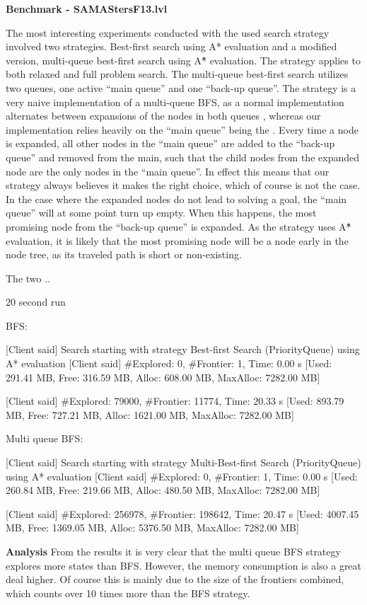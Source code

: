 \textbf{Benchmark - SAMAStersF13.lvl}


The most interesting experiments conducted with the used search strategy involved two strategies. Best-first search using A* evaluation and a modified version, multi-queue best-first search using A\^{*} evaluation. The strategy applies to both relaxed and full problem search. 
The multi-queue best-first search utilizes two queues, one active ``main queue'' and one ``back-up queue''. The strategy is a very naive implementation of a multi-queue BFS, as a normal implementation alternates between expansions of the nodes in both queues \cite{hector2013a}, whereas our implementation relies heavily on the ``main queue'' being the . Every time a node is expanded, all other nodes in the ``main queue'' are added to the ``back-up queue'' and removed from the main, such that the child nodes from the expanded node are the only nodes in the ``main queue''. In effect this means that our strategy always believes it makes the right choice, which of course is not the case. In the case where the expanded nodes do not lead to solving a goal, the ``main queue'' will at some point turn up empty. When this happens, the most promising node from the ``back-up queue'' is expanded. As the strategy uses A\^{*} evaluation, it is likely that the most promising node will be a node early in the node tree, as its traveled path is short or non-existing. 


The two .. 



20 second run 

BFS:

[Client said] Search starting with strategy Best-first Search (PriorityQueue) using A* evaluation
[Client said] #Explored:    0, #Frontier:   1, Time: 0.00 s     [Used: 291.41 MB, Free: 316.59 MB, Alloc: 608.00 MB, MaxAlloc: 7282.00 MB]

[Client said] #Explored: 79000, #Frontier: 11774, Time: 20.33 s     [Used: 893.79 MB, Free: 727.21 MB, Alloc: 1621.00 MB, MaxAlloc: 7282.00 MB]


Multi queue BFS:

[Client said] Search starting with strategy Multi-Best-first Search (PriorityQueue) using A* evaluation
[Client said] #Explored:    0, #Frontier:   1, Time: 0.00 s     [Used: 260.84 MB, Free: 219.66 MB, Alloc: 480.50 MB, MaxAlloc: 7282.00 MB]

[Client said] #Explored: 256978, #Frontier: 198642, Time: 20.47 s   [Used: 4007.45 MB, Free: 1369.05 MB, Alloc: 5376.50 MB, MaxAlloc: 7282.00 MB]


\textbf{Analysis}
From the results it is very clear that the multi queue BFS strategy explores more states than BFS. However, the memory consumption is also a great deal higher. Of course this is mainly due to the size of the frontiers combined, which counts over 10 times more than the BFS strategy. 


